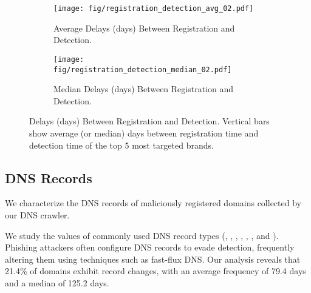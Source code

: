 \begin{figure*}[!t]
\centering
    \begin{subfigure}{0.49\textwidth}
        \texttt{[image: fig/registration\_detection\_avg\_02.pdf]}
        \vspace{-20px}
        \caption{Average Delays (days) Between Registration and Detection.}
        \label{fig:registration_detection_avg}
    \end{subfigure}
    \begin{subfigure}{0.49\textwidth}
        \texttt{[image: fig/registration\_detection\_median\_02.pdf]}
        \vspace{-20px}
        \caption{Median Delays (days) Between Registration and Detection.}
        \label{fig:registration_detection_median}
    \end{subfigure}
    \vspace{-5px}
    \caption{Delays (days) Between Registration and Detection. Vertical bars show average (or median) days between registration time and detection time of the top 5 most targeted brands.}
    \label{fig:registration_timediff}
\end{figure*}



\subsection{DNS Records}
We characterize the DNS records of maliciously registered domains collected by our DNS crawler.


We study the values of
commonly used DNS record types
(\eg, , , , , , and ). 
Phishing attackers often configure DNS records to evade detection, frequently altering them using techniques such as fast-flux DNS. 
Our analysis reveals that 21.4\% of domains exhibit record changes, with an average frequency of 79.4 days and a median of 125.2 days.

